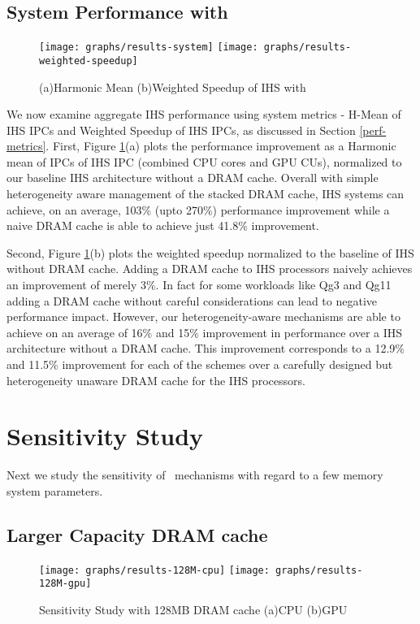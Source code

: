 \subsection{System Performance with \cachename}
\begin{figure}[!htb]
	\centering
	\texttt{[image: graphs/results-system]}
	\texttt{[image: graphs/results-weighted-speedup]}
	\caption{(a)Harmonic Mean (b)Weighted Speedup of IHS with \cachename}
	\label{results-system}
\end{figure}
\par We now examine aggregate IHS performance using system metrics - H-Mean of IHS IPCs and Weighted Speedup of IHS IPCs, as discussed in Section \ref{perf-metrics}. First, Figure \ref{results-system}(a) plots the performance improvement as a Harmonic mean of IPCs of IHS IPC (combined CPU cores and GPU CUs), normalized to our baseline IHS architecture without a DRAM cache. Overall with simple heterogeneity aware management of the stacked DRAM cache, IHS systems can achieve, on an average, 103\% (upto 270\%) performance improvement while a naive DRAM cache is able to achieve just 41.8\% improvement.
\par Second, Figure \ref{results-system}(b) plots the weighted speedup normalized to the baseline of IHS without DRAM cache. Adding a DRAM cache to IHS processors naively achieves an improvement of merely 3\%. In fact for some workloads like Qg3 and Qg11 adding a DRAM cache without careful considerations can lead to negative performance impact. However, our heterogeneity-aware mechanisms are able to achieve on an average of 16\% and 15\%  improvement in performance over a IHS architecture without a DRAM cache. This improvement corresponds to a 12.9\% and 11.5\% improvement for each of the schemes over a carefully designed but heterogeneity unaware DRAM cache for the IHS processors.


\section{Sensitivity Study} \label{sensitivity-results}

Next we study the sensitivity of \cachename\ mechanisms with regard to a few memory system parameters.

\subsection{Larger Capacity DRAM cache}


\begin{figure}[!htb]
	\centering
	\texttt{[image: graphs/results-128M-cpu]}
	\texttt{[image: graphs/results-128M-gpu]}
	\caption{Sensitivity Study with 128MB DRAM cache (a)CPU (b)GPU}
	\label{results-128m}
\end{figure}

